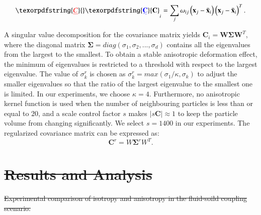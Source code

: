 \documentclass[times,twocolumn,final]{elsarticle}
\providecommand{\DIFaddtex}[1]{{\protect\color{blue}\uwave{#1}}} %
\providecommand{\DIFdeltex}[1]{{\protect\color{red}\sout{#1}}}                      %
\providecommand{\DIFaddbegin}{} %
\providecommand{\DIFaddend}{} %
\providecommand{\DIFdelbegin}{} %
\providecommand{\DIFdelend}{} %
\providecommand{\DIFdelFL}[1]{\DIFdel{#1}} %
\providecommand{\DIFadd}[1]{\texorpdfstring{\DIFaddtex{#1}}{#1}} %
\providecommand{\DIFdel}[1]{\texorpdfstring{\DIFdeltex{#1}}{}} %
\begin{document}
\begin{equation}
\DIFdelbegin \DIFdel{C}\DIFdelend \DIFaddbegin \DIFadd{\mathbf{C}}\DIFaddend _{i}=\sum_{j} \omega_{i j}\left(\mathbf{x}_{j}-\bar{\mathbf{x}}_{i}\right)\left(\mathbf{x}_{j}-\bar{\mathbf{x}}_{i}\right)^{T}\label{con:equa12}.
\end{equation}

A singular value decomposition for the covariance matrix yields $\mathbf{C}_{i}=\mathbf{W} \mathbf{\Sigma} \mathbf{W}^{T}$, where the diagonal matrix $\mathbf{\Sigma} = diag(\sigma_1,\sigma_2,...,\sigma_d)$ contains all the eigenvalues from the largest to the smallest. To obtain a stable anisotropic deformation effect, the minimum of eigenvalues is restricted to a threshold with respect to the largest eigenvalue. The value of $\sigma_k^r$ is chosen as $\sigma_k^r=max(\sigma_1/\kappa,\sigma_k)$ to adjust the smaller eigenvalues so that the ratio of the largest eigenvalue to the smallest one is limited. In our experiments, we choose $\kappa=4$. Furthermore, no anisotropic kernel function is used when the number of neighbouring particles is less than or equal to $20$, and a scale control factor $s$ makes $|s \mathbf{C}| \approx 1$ to keep the particle volume from changing significantly. We select $s=1400$ in our experiments. The regularized covariance matrix can be expressed as:
\begin{equation}
\mathbf{C}^{r}=W \mathbf{\Sigma}^{r} W^{T}.
\end{equation}

\DIFdelbegin \section{\DIFdel{Results and Analysis}}
\addtocounter{section}{-1}%

{%
\DIFdelFL{Experimental comparison of isotropy and anisotropy in the fluid-soild coupling scenario.}}
\end{document}
